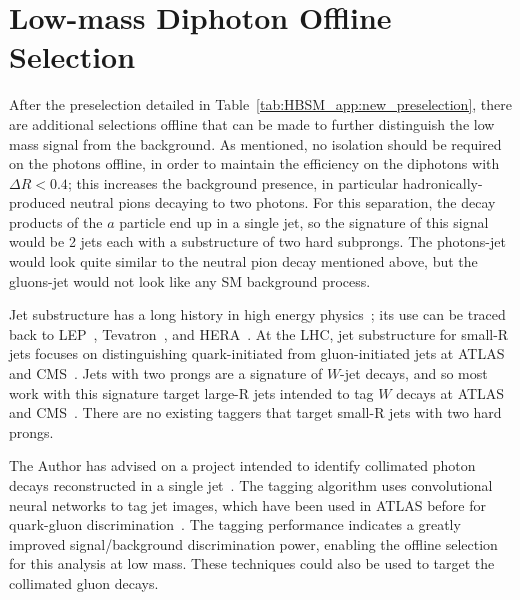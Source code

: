 \section{Low-mass Diphoton Offline Selection}
\label{sec:HBSM_app:lowmass_offline}
After the preselection detailed in Table~\ref{tab:HBSM_app:new_preselection}, there are additional selections offline that can be made to further distinguish the low mass signal from the background.
As mentioned, no isolation should be required on the photons offline, in order to maintain the efficiency on the diphotons with $\Delta R<0.4$; this increases the background presence, in particular hadronically-produced neutral pions decaying to two photons.
For this separation, the decay products of the $a$ particle end up in a single jet, so the signature of this signal would be 2 jets each with a substructure of two hard subprongs.
The photons-jet would look quite similar to the neutral pion decay mentioned above, but the gluons-jet would not look like any SM background process.

Jet substructure has a long history in high energy physics~\cite{Larkoski:2017jix,Asquith:2018igt};
its use can be traced back to LEP~\cite{Alexander:1991ce,Barate:1998cp,Abreu:1995hp,Acciarri:1997it}, Tevatron~\cite{Abe:1992wv,Abachi:1995zw}, and HERA~\cite{Breitweg:1997gg,Breitweg:1998gf,Adloff:1998ni}.
At the LHC, jet substructure for small-R jets focuses on distinguishing quark-initiated from gluon-initiated jets at ATLAS~\cite{ATL-PHYS-PUB-2017-009,Aad:2014gea,ATLAS-CONF-2016-034,ATL-PHYS-PUB-2017-017} and CMS~\cite{CMS-PAS-JME-16-003,CMS-PAS-JME-13-002,CMS-DP-2016-070,CMS-DP-2017-027}.
Jets with two prongs are a signature of $W$-jet decays, and so most work with this signature target large-R jets intended to tag $W$ decays at ATLAS~\cite{Aad:2015rpa,Aaboud:2018psm} and CMS~\cite{Khachatryan:2014vla}.
There are no existing taggers that target small-R jets with two hard prongs.

The Author has advised on a project intended to identify collimated photon decays reconstructed in a single jet~\cite{mergedphotonid}.
The tagging algorithm uses convolutional neural networks to tag jet images, which have been used in ATLAS before for quark-gluon discrimination~\cite{ATL-PHYS-PUB-2017-017}.
The tagging performance indicates a greatly improved signal/background discrimination power, enabling the offline selection for this analysis at low mass.
These techniques could also be used to target the collimated gluon decays.


